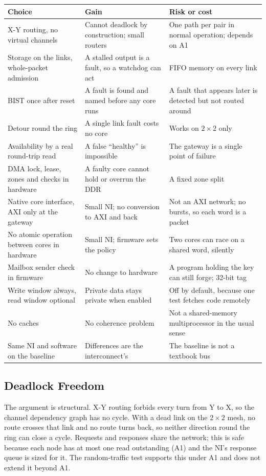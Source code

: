\documentclass[11pt,a4paper]{article}
\begin{document}
\begin{tabularx}{\textwidth}{@{}YYY@{}}
\toprule
\textbf{Choice} & \textbf{Gain} & \textbf{Risk or cost} \\
\midrule
X-Y routing, no virtual channels & Cannot deadlock by construction; small
routers & One path per pair in normal operation; depends on A1 \\
Storage on the links, whole-packet admission & A stalled output is a fault,
so a watchdog can act & FIFO memory on every link \\
BIST once after reset & A fault is found and named before any core runs &
A fault that appears later is detected but not routed around \\
Detour round the ring & A single link fault costs no core & Works on
$2\times2$ only \\
Availability by a real round-trip read & A false ``healthy'' is impossible &
The gateway is a single point of failure \\
DMA lock, lease, zones and checks in hardware & A faulty core cannot hold or
overrun the DDR & A fixed zone split \\
Native core interface, AXI only at the gateway & Small NI; no conversion to
AXI and back & Not an AXI network; no bursts, so each word is a packet \\
No atomic operation between cores in hardware & Small NI; firmware sets the
policy & Two cores can race on a shared word, silently \\
Mailbox sender check in firmware & No change to hardware & A program holding
the key can still forge; 32-bit tag \\
Write window always, read window optional & Private data stays private when
enabled & Off by default, because one test fetches code remotely \\
No caches & No coherence problem & Not a shared-memory multiprocessor in the
usual sense \\
Same NI and software on the baseline & Differences are the interconnect's &
The baseline is not a textbook bus \\
\bottomrule
\end{tabularx}

\subsection{Deadlock Freedom}

The argument is structural. X-Y routing forbids every turn from Y to X, so the
channel dependency graph has no cycle. With a dead link on the $2\times2$
mesh, no route crosses that link and no route turns back, so neither direction
round the ring can close a cycle. Requests and responses share the network;
this is safe because each node has at most one read outstanding (A1) and the
NI's response queue is sized for it. The random-traffic test supports this
under A1 and does not extend it beyond A1.
\end{document}
